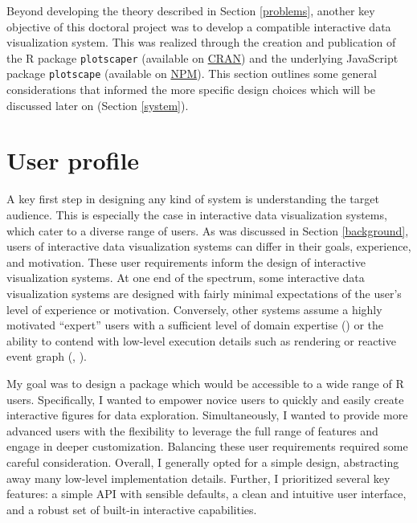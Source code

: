 \documentclass[
  openany]{book}
\theoremstyle{definition}
\theoremstyle{definition}
\theoremstyle{definition}
\theoremstyle{definition}
\theoremstyle{remark}
\begin{document}
Beyond developing the theory described in Section \ref{problems}, another key objective of this doctoral project was to develop a compatible interactive data visualization system. This was realized through the creation and publication of the R package \texttt{plotscaper} (available on \href{https://cran.r-project.org/web/packages/plotscaper/index.html}{CRAN}) and the underlying JavaScript package \texttt{plotscape} (available on \href{https://www.npmjs.com/package/@abartonicek/plotscape}{NPM}). This section outlines some general considerations that informed the more specific design choices which will be discussed later on (Section \ref{system}).

\section{User profile}\label{user-profile}

A key first step in designing any kind of system is understanding the target audience. This is especially the case in interactive data visualization systems, which cater to a diverse range of users. As was discussed in Section \ref{background}, users of interactive data visualization systems can differ in their goals, experience, and motivation. These user requirements inform the design of interactive visualization systems. At one end of the spectrum, some interactive data visualization systems are designed with fairly minimal expectations of the user's level of experience or motivation. Conversely, other systems assume a highly motivated ``expert'' users with a sufficient level of domain expertise () or the ability to contend with low-level execution details such as rendering or reactive event graph (, ).

My goal was to design a package which would be accessible to a wide range of R users. Specifically, I wanted to empower novice users to quickly and easily create interactive figures for data exploration. Simultaneously, I wanted to provide more advanced users with the flexibility to leverage the full range of features and engage in deeper customization. Balancing these user requirements required some careful consideration. Overall, I generally opted for a simple design, abstracting away many low-level implementation details. Further, I prioritized several key features: a simple API with sensible defaults, a clean and intuitive user interface, and a robust set of built-in interactive capabilities.
\end{document}
